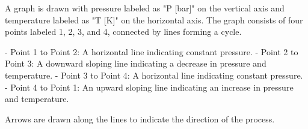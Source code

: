 A graph is drawn with pressure labeled as "P [bar]" on the vertical axis and temperature labeled as "T [K]" on the horizontal axis. The graph consists of four points labeled 1, 2, 3, and 4, connected by lines forming a cycle.  

- Point 1 to Point 2: A horizontal line indicating constant pressure.  
- Point 2 to Point 3: A downward sloping line indicating a decrease in pressure and temperature.  
- Point 3 to Point 4: A horizontal line indicating constant pressure.  
- Point 4 to Point 1: An upward sloping line indicating an increase in pressure and temperature.  

Arrows are drawn along the lines to indicate the direction of the process.